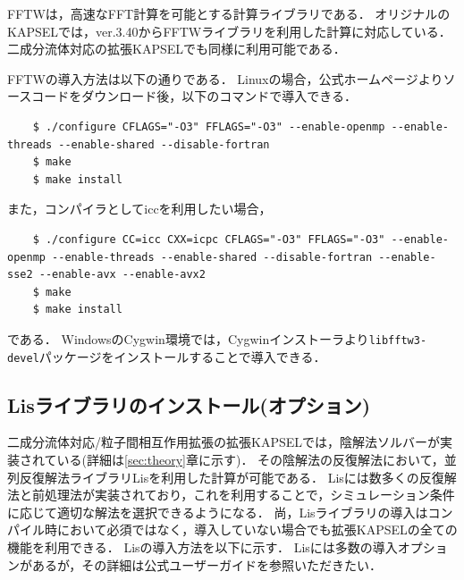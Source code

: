 \documentclass[pdflatex,a4paper,10pt,ja=standard]{bxjsarticle}
\begin{document}
FFTW\autocite{fftw}は，高速なFFT計算を可能とする計算ライブラリである．
オリジナルのKAPSELでは，ver.3.40からFFTWライブラリを利用した計算に対応している．
二成分流体対応の拡張KAPSELでも同様に利用可能である．

FFTWの導入方法は以下の通りである．
Linuxの場合，公式ホームページ\autocite{fftw_download}よりソースコードをダウンロード後，以下のコマンドで導入できる．
\begin{verbatim}
    $ ./configure CFLAGS="-O3" FFLAGS="-O3" --enable-openmp --enable-threads --enable-shared --disable-fortran
    $ make
    $ make install
\end{verbatim}
また，コンパイラとしてiccを利用したい場合，
\begin{verbatim}
    $ ./configure CC=icc CXX=icpc CFLAGS="-O3" FFLAGS="-O3" --enable-openmp --enable-threads --enable-shared --disable-fortran --enable-sse2 --enable-avx --enable-avx2
    $ make
    $ make install
\end{verbatim}
である．
WindowsのCygwin環境では，Cygwinインストーラより\verb|libfftw3-devel|パッケージをインストールすることで導入できる．

\subsection{Lisライブラリのインストール(オプション)}
\label{sec:lis}

二成分流体対応/粒子間相互作用拡張の拡張KAPSELでは，陰解法ソルバーが実装されている(詳細は\ref{sec:theory}章に示す)．
その陰解法の反復解法において，並列反復解法ライブラリLisを利用した計算が可能である\autocite{lis}．
Lisには数多くの反復解法と前処理法が実装されており，これを利用することで，シミュレーション条件に応じて適切な解法を選択できるようになる．
尚，Lisライブラリの導入はコンパイル時において必須ではなく，導入していない場合でも拡張KAPSELの全ての機能を利用できる．
Lisの導入方法を以下に示す．
Lisには多数の導入オプションがあるが，その詳細は公式ユーザーガイド\autocite{lis_document}を参照いただきたい．
\end{document}
